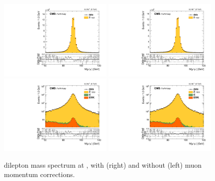 \begin{figure}[htbp]
\centering
\includegraphics[width=0.49\textwidth]{plots/LepScaleSmear/plotZmm5TeV_noCorr/zmm.pdf}
\includegraphics[width=0.49\textwidth]{plots/LepScaleSmear/plotZmm5TeV_corr/zmm.pdf}
\\
\includegraphics[width=0.49\textwidth]{plots/LepScaleSmear/plotZmm5TeV_noCorr/zmmlog.pdf}
\includegraphics[width=0.49\textwidth]{plots/LepScaleSmear/plotZmm5TeV_corr/zmmlog.pdf}
\caption{\zmm dilepton mass spectrum at \sg, with (right) and without (left) muon momentum corrections.}
\label{fig:lepscale:zmm:5}
\end{figure}